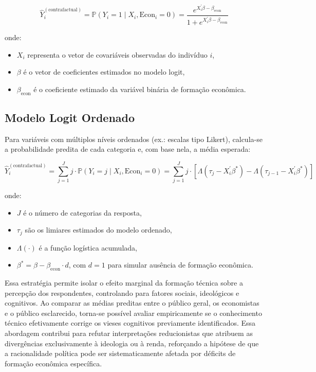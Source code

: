 \[
\hat{Y}_i^{(\text{contrafactual})} = \mathbb{P}(Y_i = 1 \mid X_i, \text{Econ}_i = 0) = \frac{e^{X_i^\prime \beta - \beta_{\text{econ}}}}{1 + e^{X_i^\prime \beta - \beta_{\text{econ}}}}
\]

\noindent onde:
\begin{itemize}
  \item \( X_i \) representa o vetor de covariáveis observadas do indivíduo \( i \),
  \item \( \beta \) é o vetor de coeficientes estimados no modelo logit,
  \item \( \beta_{\text{econ}} \) é o coeficiente estimado da variável binária de formação econômica.
\end{itemize}

\subsection{Modelo Logit Ordenado}

Para variáveis com múltiplos níveis ordenados (ex.: escalas tipo Likert), calcula-se a probabilidade predita de cada categoria e, com base nela, a média esperada:

\[
\hat{Y}_i^{(\text{contrafactual})} = \sum_{j=1}^J j \cdot \mathbb{P}(Y_i = j \mid X_i, \text{Econ}_i = 0) = \sum_{j=1}^J j \cdot \left[ \Lambda(\tau_j - X_i^\prime \beta^*) - \Lambda(\tau_{j-1} - X_i^\prime \beta^*) \right]
\]

\noindent onde:
\begin{itemize}
  \item \( J \) é o número de categorias da resposta,
  \item \( \tau_j \) são os limiares estimados do modelo ordenado,
  \item \( \Lambda(\cdot) \) é a função logística acumulada,
  \item \( \beta^* = \beta - \beta_{\text{econ}} \cdot d \), com \( d = 1 \) para simular ausência de formação econômica.
\end{itemize}

\bigskip

Essa estratégia permite isolar o efeito marginal da formação técnica sobre a percepção dos respondentes, controlando para fatores sociais, ideológicos e cognitivos. Ao comparar as médias preditas entre o público geral, os economistas e o público esclarecido, torna-se possível avaliar empiricamente se o conhecimento técnico efetivamente corrige os vieses cognitivos previamente identificados. Essa abordagem contribui para refutar interpretações reducionistas que atribuem as divergências exclusivamente à ideologia ou à renda, reforçando a hipótese de que a racionalidade política pode ser sistematicamente afetada por déficits de formação econômica específica.

